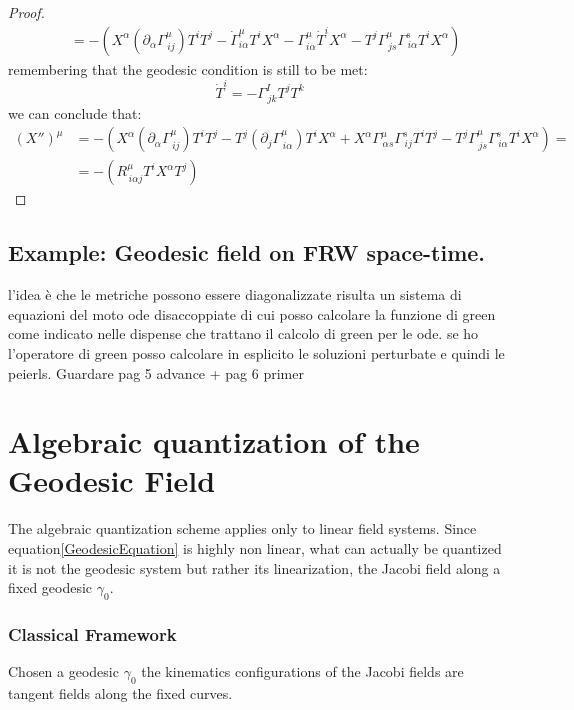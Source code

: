 \documentclass[Main]{subfiles}
\begin{document}
\begin{proof}
\begin{align*}
			&=			
			-\left(
			X^\alpha\left(\partial_\alpha\Gamma^{\mu}_{\, i j}\right)T^i T^j - \dot{\Gamma}^\mu_{i \alpha} T^i X^\alpha
			- \Gamma^\mu_{i \alpha} \dot{T}^i X^\alpha  - T^j \Gamma^\mu_{\, j s} \Gamma^s_{\, i \alpha} T^i X^\alpha				
			\right)
		\end{align*}
		remembering that the geodesic condition is still to be met:
		\begin{displaymath}
			\dot{T}^i = - \Gamma^I_{\, j k} T^j T^k
		\end{displaymath}
		we can conclude that:
		\begin{align*}
			\left(X'' \right)^\mu &=
			- \left(
			  X^\alpha\left( \partial_\alpha\Gamma^\mu_{\, i j}\right)T^i T^j
			- T^j \left( \partial_j \Gamma^\mu_{\, i \alpha}\right) T^i X^\alpha
			+X^\alpha \Gamma^\mu_{\, \alpha s} \Gamma^s_{\, i j}T^i T^j 
			- T^j \Gamma^\mu_{\, j s} \Gamma^s_{\, i \alpha} T^i X^\alpha
			\right) =\\
			&=	-\left( R^\mu_{\, i \alpha j}T^i X^\alpha T^j\right)		
		\end{align*}
	\end{proof}
	
	

	
	

\subsection{Example: Geodesic field on FRW space-time.}
	l'idea è che le metriche possono essere diagonalizzate risulta un sistema di equazioni del moto ode disaccoppiate di cui posso calcolare la funzione di green come indicato nelle dispense che trattano il calcolo di green per le ode.
	se ho l'operatore di green posso calcolare in esplicito le soluzioni perturbate e quindi le peierls.
	Guardare pag 5 advance + pag 6 primer	
	

\section{Algebraic quantization of the Geodesic Field}
	The algebraic quantization scheme applies only to linear field systems.
	Since equation\ref{GeodesicEquation} is highly non linear, what can actually be quantized it is not the geodesic system but rather its linearization, the Jacobi field along a fixed geodesic $\gamma_0$.
	
		\subsubsection{Classical Framework}
			Chosen a geodesic $\gamma_0$ the kinematics configurations of the Jacobi fields are tangent fields along the fixed curves.
\end{document}
